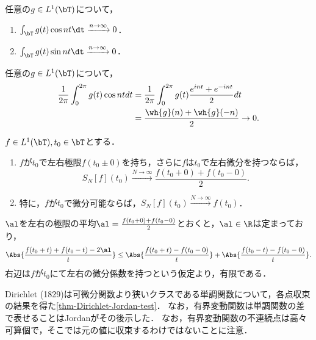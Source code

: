 \documentclass[uplatex,dvipdfmx]{jsreport}
\begin{document}
\begin{lemma}\label{lemma-cor-of-Riemann-Lebesgue}
    任意の$g\in L^1(\bT)$について，
    \begin{enumerate}
        \item $\int_\bT g(t)\cos nt\dt\xrightarrow{n\to\infty}0$．
        \item $\int_\bT g(t)\sin nt\dt\xrightarrow{n\to\infty}0$．
    \end{enumerate}
\end{lemma}
\begin{Proof}
    任意の$g\in L^1(\bT)$について，
    \begin{align*}
        \frac{1}{2\pi}\int^{2\pi}_0g(t)\cos ntdt&=\frac{1}{2\pi}\int^{2\pi}_0g(t)\frac{e^{int}+e^{-int}}{2}dt\\
        &=\frac{\wh{g}(n)+\wh{g}(-n)}{2}\to0.
    \end{align*}
\end{Proof}

\begin{corollary}[可微分点においてFourier級数は収束する]\label{cor-Fourier-sum-converges-at-differentiable-points}
    $f\in L^1(\bT),t_0\in\bT$とする．
    \begin{enumerate}
        \item $f$が$t_0$で左右極限$f(t_0\pm0)$を持ち，さらに$f$は$t_0$で左右微分を持つならば，
        \[S_N[f](t_0)\xrightarrow{N\to\infty}\frac{f(t_0+0)+f(t_0-0)}{2}.\]
        \item 特に，$f$が$t_0$で微分可能ならば，$S_N[f](t_0)\xrightarrow{N\to\infty}f(t_0)$．
    \end{enumerate}
\end{corollary}
\begin{Proof}
    $\al$を左右の極限の平均$\al=\frac{f(t_0+0)+f(t_0-0)}{2}$とおくと，$\al\in\R$は定まっており，
    \[\Abs{\frac{f(t_0+t)+f(t_0-t)-2\al}{t}}\le\Abs{\frac{f(t_0+t)-f(t_0-0)}{t}}+\Abs{\frac{f(t_0-t)-f(t_0-0)}{t}}.\]
    右辺は$f$が$t_0$にて左右の微分係数を持つという仮定より，有限である．
\end{Proof}
\begin{history}[他の判定条件]
    Dirichlet (1829)は可微分関数より狭いクラスである単調関数について，各点収束の結果を得た\ref{thm-Dirichlet-Jordan-test}．
    なお，有界変動関数は単調関数の差で表せることはJordanがその後示した．
    なお，有界変動関数の不連続点は高々可算個で，そこでは元の値に収束するわけではないことに注意．
\end{history}
\end{document}
